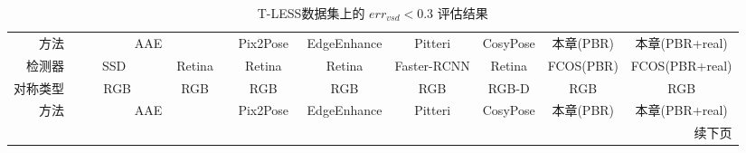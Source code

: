         {
        \scriptsize
        \begin{longtable}{r| c c c c c c c c}
        \caption{T-LESS数据集上的 $err_{vsd} < 0.3$ 评估结果} \label{tab:tless_vsd} \\
        \toprule
        方法& \multicolumn{2}{c}{AAE \cite{sundermeyer2018implicit}} & Pix2Pose \cite{park2019pix2pose}& EdgeEnhance \cite{wen2020edge}& Pitteri\cite{pitteri2019object} & CosyPose\cite{labbe2020cosypose}& 本章(PBR) & 本章(PBR+real)\\
        \cmidrule(lr){2-3}\cmidrule(lr){4-4}\cmidrule(lr){5-5}\cmidrule(lr){6-6}\cmidrule(lr){7-7}\cmidrule(lr){8-9}
        检测器&\ \ \ \ SSD\ \ \ \ \  &\ Retina\ &\ \ Retina\ \ &\ \ Retina\ \ & Faster-RCNN & Retina & FCOS(PBR) & FCOS(PBR+real)\\
        对称类型& RGB & RGB & RGB &RGB& RGB &RGB-D& RGB &RGB \\
        \midrule
        \endfirsthead

        \toprule
        方法 & \multicolumn{2}{c}{AAE \cite{sundermeyer2018implicit}} & Pix2Pose \cite{park2019pix2pose} & EdgeEnhance \cite{wen2020edge} & Pitteri \cite{pitteri2019object} & CosyPose \cite{labbe2020cosypose} &本章(PBR) & 本章(PBR+real) \\
        \midrule
        \endhead

        \midrule
        \multicolumn{9}{r}{续下页}
        \endfoot

        \bottomrule
        \endlastfoot


\end{longtable}}
